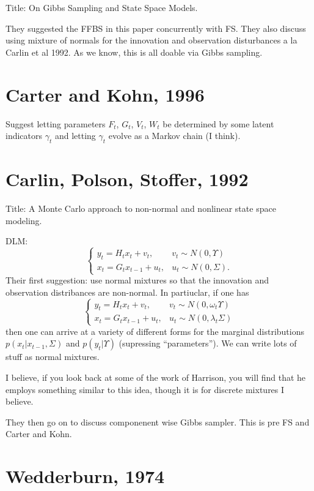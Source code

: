 \documentclass{article}
\begin{document}
Title: On Gibbs Sampling and State Space Models.

They suggested the FFBS in this paper concurrently with FS.  They also discuss
using mixture of normals for the innovation and observation disturbances a la
Carlin et al 1992.  As we know, this is all doable via Gibbs sampling.

\section{Carter and Kohn, 1996}

Suggest letting parameters $F_t$, $G_t$, $V_t$, $W_t$ be determined by some
latent indicators $\gamma_t$ and letting $\gamma_t$ evolve as a Markov chain (I
think).

\section{Carlin, Polson, Stoffer, 1992}

Title: A Monte Carlo approach to non-normal and nonlinear state space modeling.

DLM:
\[
\begin{cases}
y_t = H_t x_t + v_t, & v_t \sim N(0, \Upsilon) \\
x_t = G_t x_{t-1} + u_t, & u_t \sim N(0, \Sigma).
\end{cases}
\]
Their first suggestion: use normal mixtures so that the innovation and
observation distribances are non-normal.  In partiuclar, if one has
\[
\begin{cases}
y_t = H_t x_t + v_t, & v_t \sim N(0, \omega_t \Upsilon) \\
x_t = G_t x_{t-1} + u_t, & u_t \sim N(0, \lambda_t \Sigma)
\end{cases}
\]
then one can arrive at a variety of different forms for the marginal
distributions $p(x_t | x_{t-1}, \Sigma)$ and $p(y_t | \Upsilon)$ (supressing
``parameters'').  We can write lots of stuff as normal mixtures.

I believe, if you look back at some of the work of Harrison, you will find that
he employs something similar to this idea, though it is for discrete mixtures I
believe.

They then go on to discuss componenent wise Gibbs sampler.  This is pre FS and
Carter and Kohn.

\section{Wedderburn, 1974}
\end{document}
